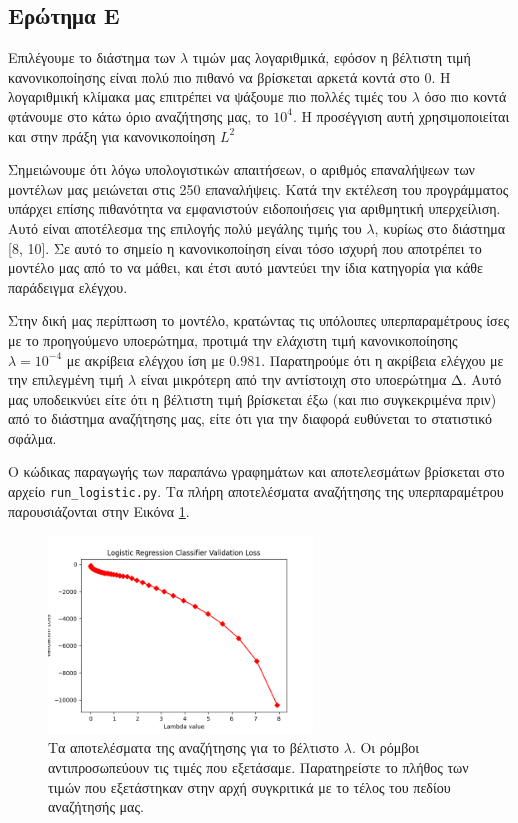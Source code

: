 \documentclass{article}
\newcommand{\code}{\texttt}
\begin{document}
\subsection{Ερώτημα Ε}
Επιλέγουμε το διάστημα των \code{$\lambda$} τιμών μας λογαριθμικά, εφόσον η βέλτιστη τιμή κανονικοποίησης είναι πολύ πιο πιθανό να βρίσκεται αρκετά κοντά στο 0. Η λογαριθμική κλίμακα μας επιτρέπει να ψάξουμε πιο πολλές τιμές του \code{$\lambda$} όσο πιο κοντά φτάνουμε στο κάτω όριο αναζήτησης μας, το $10^{4}$. Η προσέγγιση αυτή χρησιμοποιείται και στην πράξη για κανονικοποίηση $L^{2}$ \cite{jerome}\par

Σημειώνουμε ότι λόγω υπολογιστικών απαιτήσεων, ο αριθμός επαναλήψεων των μοντέλων μας μειώνεται στις 250 επαναλήψεις. Κατά την εκτέλεση του προγράμματος υπάρχει επίσης πιθανότητα να εμφανιστούν ειδοποιήσεις για αριθμητική υπερχείλιση. Αυτό είναι αποτέλεσμα της επιλογής πολύ μεγάλης τιμής του \code{$\lambda$}, κυρίως στο διάστημα [8, 10]. Σε αυτό το σημείο η κανονικοποίηση είναι τόσο ισχυρή που αποτρέπει το μοντέλο μας από το να μάθει, και έτσι αυτό μαντεύει την ίδια κατηγορία για κάθε παράδειγμα ελέγχου.\par

Στην δική μας περίπτωση το μοντέλο, κρατώντας τις υπόλοιπες υπερπαραμέτρους ίσες με το προηγούμενο υποερώτημα, προτιμά την ελάχιστη τιμή κανονικοποίησης \code{$\lambda = 10^{-4}$} με  ακρίβεια ελέγχου ίση με $0.981$. Παρατηρούμε ότι η ακρίβεια ελέγχου με την επιλεγμένη τιμή \code{$\lambda$} είναι μικρότερη από την αντίστοιχη στο υποερώτημα Δ. Αυτό μας υποδεικνύει είτε ότι η βέλτιστη τιμή βρίσκεται έξω (και πιο συγκεκριμένα πριν) από το διάστημα αναζήτησης μας, είτε ότι για την διαφορά ευθύνεται το στατιστικό σφάλμα. \par

Ο κώδικας παραγωγής των παραπάνω γραφημάτων και αποτελεσμάτων βρίσκεται στο αρχείο \code{run\_logistic.py}. Τα πλήρη αποτελέσματα αναζήτησης της υπερπαραμέτρου παρουσιάζονται στην Εικόνα \ref{logistic_lambda_accuracy}.

\begin{figure}
	\includegraphics[width=7cm]{logistic_lambda_accuracy.png}
	\centering
	\caption{ Τα αποτελέσματα της αναζήτησης για το βέλτιστο \code{$\lambda$}. Οι ρόμβοι αντιπροσωπεύουν τις τιμές που εξετάσαμε. Παρατηρείστε το πλήθος των τιμών που εξετάστηκαν στην αρχή συγκριτικά με το τέλος του πεδίου αναζήτησής μας.}
	\label{logistic_lambda_accuracy}
\end{figure}
\end{document}
